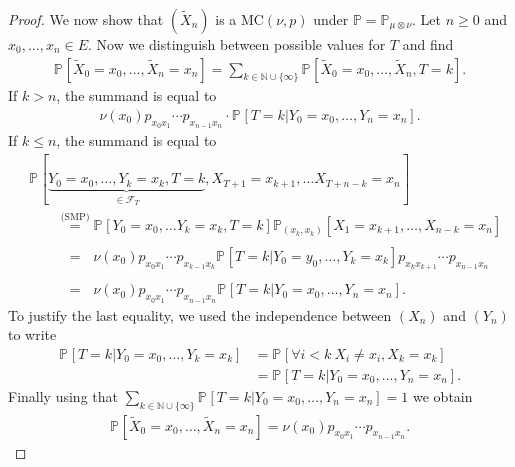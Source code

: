 \begin{proof}
We now show that $(\tilde{X}_n)$ is a MC$(\nu, p)$ under $\mathbb{P} = \mathbb{P}_{\mu \otimes \nu}$. Let $n\geq 0$ and $x_0, \ldots, x_n \in E$. Now we distinguish between possible values for $T$ and find
\begin{align}
	\mathbb{P}_{} \left[ \tilde{X}_0 = x_0, \ldots , \tilde{X}_n = x_n \right] = \sum_{k \in \mathbb{N} \cup \{\infty\}}^{} \mathbb{P}_{} \left[ \tilde{X}_0 = x_0, \ldots , \tilde{X}_n , T=k \right] .
\end{align}
If $k>n$, the summand is equal to 
\begin{align}
	\nu (x_0) p_{x_0x_1}\cdots p_{x_{n-1}x_n} \cdot \mathbb{P}_{} \left[ T=k | Y_0 = x_0, \ldots , Y_n=x_n \right].
\end{align}
If $k \leq n$, the summand is equal to
\begin{align}
	&\mathbb{P}_{} \left[ \underbrace{Y_0=x_0, \ldots , Y_k=x_k,T=k}_{\in \mathcal{F}_T},X_{T+1}=x_{k+1}, \ldots X_{T+n-k}=x_n \right]  \\
	&\qquad \stackrel{\textrm{(SMP)}}{=} \mathbb{P}_{} \left[ Y_0=x_0, \ldots Y_k=x_k, T=k \right] \mathbb{P}_{(x_k, x_k)} \left[ X_1=x_{k+1}, \ldots , X_{n-k}=x_n \right]  \\
	&\qquad \stackrel{\phantom{\textrm{(SMP)}}}{=} \nu (x_0) p_{x_0x_1}\cdots p_{x_{k-1}x_k} \mathbb{P}_{} \left[ T=k | Y_0 = y_0, \ldots, Y_k=x_k \right] p_{x_k x_{k+1}} \cdots p_{x_{n-1}x_n}  \\
	&\qquad \stackrel{\phantom{\textrm{(SMP)}}}{=} \nu (x_0) p_{x_0 x_1} \cdots p_{x_{n-1}x_n} \mathbb{P}_{} \left[ T=k | Y_0=x_0, \ldots, Y_n=x_n \right]  .
\end{align}
To justify the last equality, we used the independence between $(X_n)$ and $(Y_n)$ to write
 \begin{align}
	 \mathbb{P}_{} \left[ T=k | Y_0=x_0, \ldots , Y_k =x_k \right] &= \mathbb{P}_{} \left[ \forall i<k\ X_i \neq x_i, X_k=x_k \right] \\
								       &= \mathbb{P}_{} \left[ T=k | Y_0=x_0, \ldots , Y_n=x_n \right] . 
\end{align}
Finally using that $\sum_{k \in \mathbb{N}\cup \{\infty\}}^{} \mathbb{P}_{} \left[ T=k | Y_0 = x_0, \ldots , Y_n =x_n \right] =1$ we obtain
\begin{align}
	\mathbb{P}_{} \left[ \tilde{X}_0 = x_0, \ldots , \tilde{X}_n=x_n \right] = \nu (x_0) p_{x_0 x_1} \cdots p_{x_{n-1}x_n}.
\end{align}
\end{proof}
